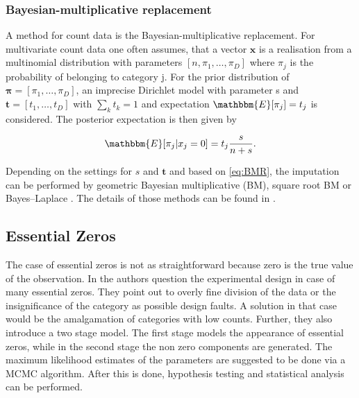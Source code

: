 \subsubsection{Bayesian-multiplicative replacement}
\label{sec:Bayesian-multiplicative replacement}

A method for count data is the Bayesian-multiplicative replacement. For multivariate count data one often assumes, that a vector $\bm{x}$ is a realisation from a multinomial distribution with parameters $[n,\pi_1,\ldots,\pi_D]$ where $\pi_j$ is the probability of belonging to category j. For the prior distribution of $\bm{\pi}=[\pi_1,\ldots,\pi_D]$, an imprecise Dirichlet model with parameter s and $\bm{t}=[t_1,\ldots,t_D]$ with $\sum_k t_k=1$ and expectation $\mathbbm{E}[\pi_j]=t_j$ is considered. The posterior expectation is then given by \cite{Palarea-Albaladejo:2015} 


\begin{equation}
\mathbbm{E}[\pi_j|x_j=0]=t_j \frac{s}{n+s}.
\label{eq:BMR}
\end{equation}

Depending on the settings for $s$ and $\bm{t}$ and based on \ref{eq:BMR}, the imputation can be performed by geometric Bayesian multiplicative (BM), square root BM or Bayes–Laplace  \cite{Palarea-Albaladejo:2015}. The details of those methods can be found in \cite{Fernandez:2015}. 


\subsection{Essential Zeros}
\label{sec: Essential Zeros}

The case of essential zeros is not as straightforward because zero is the true value of the observation. In \cite{Aitchison:2003} the authors question the experimental design in case of many essential zeros. They point out to overly fine division of the data or the insignificance of the category as possible design faults. A solution in that case would be the amalgamation of categories with low counts. Further, they also introduce a two stage model. The first stage models the appearance of essential zeros, while in the second stage the non zero components are generated. The maximum likelihood estimates of the parameters are suggested to be done via a MCMC algorithm. After this is done, hypothesis testing and statistical analysis can be performed. 

